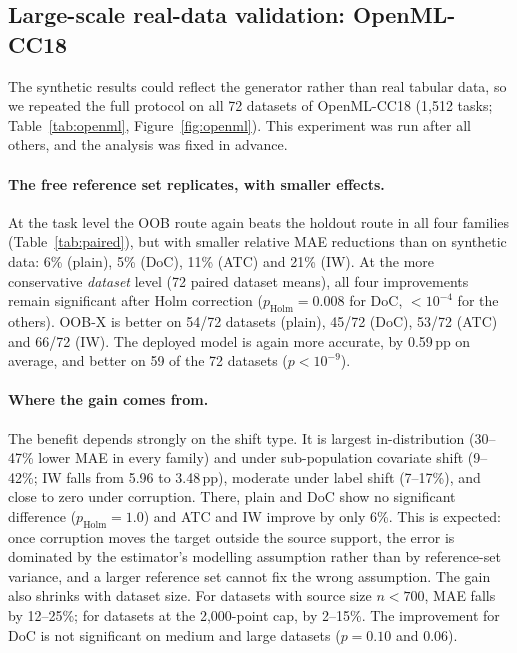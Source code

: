 \subsection{Large-scale real-data validation: OpenML-CC18}
\label{sec:openml}

The synthetic results could reflect the generator rather than real tabular data, so we repeated the full protocol on all 72 datasets of OpenML-CC18 (1{,}512 tasks; Table~\ref{tab:openml}, Figure~\ref{fig:openml}). This experiment was run after all others, and the analysis was fixed in advance.

\paragraph{The free reference set replicates, with smaller effects.}
At the task level the OOB route again beats the holdout route in all four families (Table~\ref{tab:paired}), but with smaller relative MAE reductions than on synthetic data: 6\% (plain), 5\% (DoC), 11\% (ATC) and 21\% (IW). At the more conservative \emph{dataset} level (72 paired dataset means), all four improvements remain significant after Holm correction ($p_{\mathrm{Holm}}=0.008$ for DoC, $<10^{-4}$ for the others). OOB-X is better on 54/72 datasets (plain), 45/72 (DoC), 53/72 (ATC) and 66/72 (IW). The deployed model is again more accurate, by 0.59\,pp on average, and better on 59 of the 72 datasets ($p<10^{-9}$).

\paragraph{Where the gain comes from.}
The benefit depends strongly on the shift type. It is largest in-distribution (30--47\% lower MAE in every family) and under sub-population covariate shift (9--42\%; IW falls from 5.96 to 3.48\,pp), moderate under label shift (7--17\%), and close to zero under corruption. There, plain and DoC show no significant difference ($p_{\mathrm{Holm}}=1.0$) and ATC and IW improve by only 6\%. This is expected: once corruption moves the target outside the source support, the error is dominated by the estimator's modelling assumption rather than by reference-set variance, and a larger reference set cannot fix the wrong assumption. The gain also shrinks with dataset size. For datasets with source size $n<700$, MAE falls by 12--25\%; for datasets at the 2{,}000-point cap, by 2--15\%. The improvement for DoC is not significant on medium and large datasets ($p=0.10$ and $0.06$).

